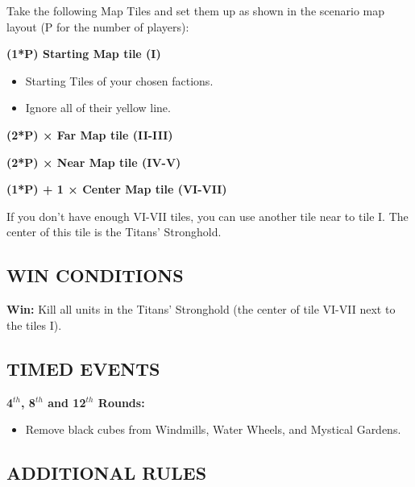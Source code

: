 \begin{multicols*}{2}
Take the following Map Tiles and set them up as shown in the scenario map layout (P for the number of players):

\textbf{(1*P) Starting Map tile (I)}
\begin{itemize}
    \item Starting Tiles of your chosen factions.
    \item Ignore all of their yellow line.
\end{itemize}

\textbf{(2*P) × Far Map tile (II-III)}

\textbf{(2*P) × Near Map tile (IV-V)}

\textbf{(1*P) + 1 × Center Map tile (VI-VII)}

If you don't have enough VI-VII tiles, you can use another tile near to tile I.
The center of this tile is the Titans' Stronghold.

\subsection*{\MakeUppercase{Win Conditions}}

\textbf{Win:} Kill all units in the Titans' Stronghold (the center of tile VI-VII next to the tiles I).

\subsection*{\MakeUppercase{Timed Events}}

\textbf{4$^{th}$, 8$^{th}$ and 12$^{th}$ Rounds:}
\begin{itemize}
    \item Remove black cubes from Windmills, Water Wheels, and Mystical Gardens.
\end{itemize}

\end{multicols*}

\newpage

\subsection*{\MakeUppercase{Additional rules}}

